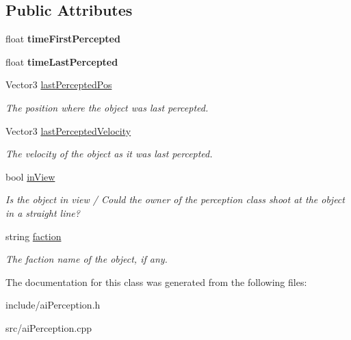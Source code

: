\subsection*{\-Public \-Attributes}
\begin{DoxyCompactItemize}
\item 
\hypertarget{classAIPerceptedObject_ae3f0214c70707399d4d09c59d4f2eb44}{
float {\bfseries time\-First\-Percepted}}
\label{db/d6d/classAIPerceptedObject_ae3f0214c70707399d4d09c59d4f2eb44}

\item 
\hypertarget{classAIPerceptedObject_ab49584f5e37d92830e5da1b167cdccf3}{
float {\bfseries time\-Last\-Percepted}}
\label{db/d6d/classAIPerceptedObject_ab49584f5e37d92830e5da1b167cdccf3}

\item 
\hypertarget{classAIPerceptedObject_a914ee50f98fda3227aff0ef65cbd6ea2}{
\-Vector3 \hyperlink{classAIPerceptedObject_a914ee50f98fda3227aff0ef65cbd6ea2}{last\-Percepted\-Pos}}
\label{db/d6d/classAIPerceptedObject_a914ee50f98fda3227aff0ef65cbd6ea2}

\begin{DoxyCompactList}\small\item\em \-The position where the object was last percepted. \end{DoxyCompactList}\item 
\hypertarget{classAIPerceptedObject_a80f0d462a285d9d82e039b603c687d50}{
\-Vector3 \hyperlink{classAIPerceptedObject_a80f0d462a285d9d82e039b603c687d50}{last\-Percepted\-Velocity}}
\label{db/d6d/classAIPerceptedObject_a80f0d462a285d9d82e039b603c687d50}

\begin{DoxyCompactList}\small\item\em \-The velocity of the object as it was last percepted. \end{DoxyCompactList}\item 
\hypertarget{classAIPerceptedObject_a5cb4610442de33582dc2206023d26f2c}{
bool \hyperlink{classAIPerceptedObject_a5cb4610442de33582dc2206023d26f2c}{in\-View}}
\label{db/d6d/classAIPerceptedObject_a5cb4610442de33582dc2206023d26f2c}

\begin{DoxyCompactList}\small\item\em \-Is the object in view / \-Could the owner of the perception class shoot at the object in a straight line? \end{DoxyCompactList}\item 
\hypertarget{classAIPerceptedObject_aa296dc29dd085ee11b4d60b91434d302}{
string \hyperlink{classAIPerceptedObject_aa296dc29dd085ee11b4d60b91434d302}{faction}}
\label{db/d6d/classAIPerceptedObject_aa296dc29dd085ee11b4d60b91434d302}

\begin{DoxyCompactList}\small\item\em \-The faction name of the object, if any. \end{DoxyCompactList}\end{DoxyCompactItemize}


\-The documentation for this class was generated from the following files\-:\begin{DoxyCompactItemize}
\item 
include/ai\-Perception.\-h\item 
src/ai\-Perception.\-cpp\end{DoxyCompactItemize}
